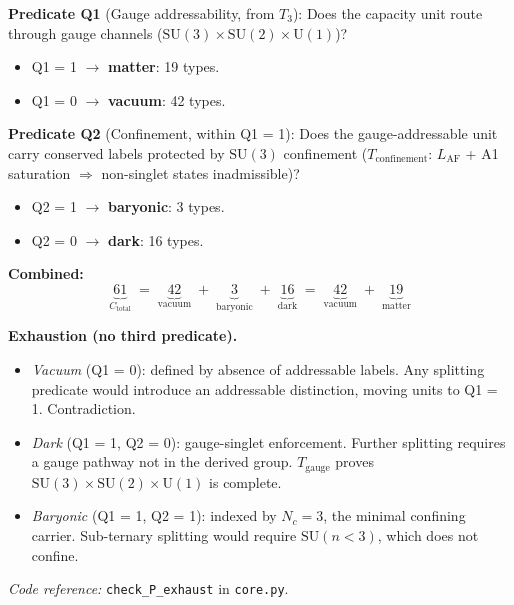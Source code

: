 \documentclass[11pt]{article}
\newenvironment{varlist}{\begin{itemize}[nosep,leftmargin=2em]}{\end{itemize}}
\newcommand{\coderef}[2]{\smallskip\noindent\textit{Code reference:} \texttt{#1} in \texttt{#2}.}
\newcommand{\SU}{\mathrm{SU}}
\newcommand{\U}{\mathrm{U}}
\begin{document}
\begin{tcolorbox}[apfbox, title={$P_{\mathrm{exhaust}}$ (Predicate Exhaustion --- MECE Partition)}]
\textbf{Predicate Q1} (Gauge addressability, from $T_3$): Does the capacity unit route through gauge channels ($\SU(3) \times \SU(2) \times \U(1)$)?
\begin{varlist}
\item Q1 = 1 $\to$ \textbf{matter}: 19 types.
\item Q1 = 0 $\to$ \textbf{vacuum}: 42 types.
\end{varlist}

\smallskip\noindent\textbf{Predicate Q2} (Confinement, within Q1 = 1): Does the gauge-addressable unit carry conserved labels protected by $\SU(3)$ confinement ($T_{\mathrm{confinement}}$: $L_{\mathrm{AF}}$ + A1 saturation $\Rightarrow$ non-singlet states inadmissible)?
\begin{varlist}
\item Q2 = 1 $\to$ \textbf{baryonic}: 3 types.
\item Q2 = 0 $\to$ \textbf{dark}: 16 types.
\end{varlist}

\smallskip\noindent\textbf{Combined:}
\begin{equation}
\underbrace{61}_{C_{\mathrm{total}}} \;=\; \underbrace{42}_{\text{vacuum}} \;+\; \underbrace{3}_{\text{baryonic}} \;+\; \underbrace{16}_{\text{dark}} \;=\; \underbrace{42}_{\text{vacuum}} \;+\; \underbrace{19}_{\text{matter}}
\label{eq:mece_partition}
\end{equation}

\smallskip\noindent\textbf{Exhaustion (no third predicate).}
\begin{varlist}
\item \textit{Vacuum} (Q1 = 0): defined by absence of addressable labels.  Any splitting predicate would introduce an addressable distinction, moving units to Q1 = 1.  Contradiction.
\item \textit{Dark} (Q1 = 1, Q2 = 0): gauge-singlet enforcement.  Further splitting requires a gauge pathway not in the derived group.  $T_{\mathrm{gauge}}$ proves $\SU(3) \times \SU(2) \times \U(1)$ is complete.
\item \textit{Baryonic} (Q1 = 1, Q2 = 1): indexed by $N_c = 3$, the minimal confining carrier.  Sub-ternary splitting would require $\SU(n < 3)$, which does not confine.
\end{varlist}

\coderef{check\_P\_exhaust}{core.py}
\end{tcolorbox}
\end{document}
